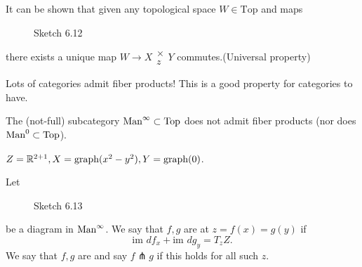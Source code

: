 \begin{remark}
It can be shown that given any topological space \(W\in \text{Top}\) and maps 
\begin{center}
\end{center}
\begin{figure}[H]\label{fig:6.12}
    \centering
    
    \caption{Sketch 6.12}
\end{figure}

there exists a unique map \(W\to X\substack{\times\\ z} Y\) commutes.(Universal property)
\end{remark}

Lots of categories admit fiber products! This is a good property for categories to have. 

 The (not-full) subcategory \(\text{Man}^\infty\subset\text{Top}\) does not admit 
fiber products (nor does \(\man0\subset\text{Top}\)). 
\begin{example}
    \(Z=\mathbb{R}^{2+1},X=\text{graph}(x^2-y^2),Y=\text{graph(0)}\).
\end{example} 

\begin{definition*}
    Let \begin{figure}[H]\label{fig:6.13}
        \centering
        \caption{Sketch 6.13}
    \end{figure}
    be a diagram in \(\text{Man}^\infty\). We say that \(f,g\) are  at \(z=f(x)=g(y)\) if 
    \[\text{im }df_x+\text{im }dg_y=T_zZ.\]
    We say that \(f,g\) are  and say \(f\pitchfork g\) if this holds 
    for all such \(z\).
\end{definition*}

